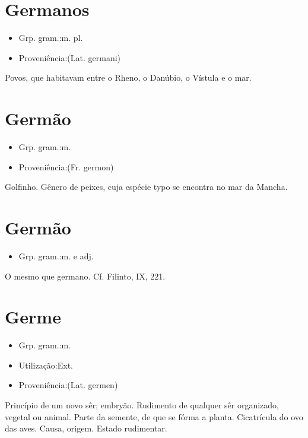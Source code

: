 \section{Germanos}
\begin{itemize}
\item {Grp. gram.:m. pl.}
\end{itemize}
\begin{itemize}
\item {Proveniência:(Lat. \textunderscore germani\textunderscore )}
\end{itemize}
Povos, que habitavam entre o Rheno, o Danúbio, o Vístula e o mar.
\section{Germão}
\begin{itemize}
\item {Grp. gram.:m.}
\end{itemize}
\begin{itemize}
\item {Proveniência:(Fr. \textunderscore germon\textunderscore )}
\end{itemize}
Golfinho.
Gênero de peixes, cuja espécie typo se encontra no mar da Mancha.
\section{Germão}
\begin{itemize}
\item {Grp. gram.:m.  e  adj.}
\end{itemize}
O mesmo que \textunderscore germano\textunderscore . Cf. Filinto, IX, 221.
\section{Germe}
\begin{itemize}
\item {Grp. gram.:m.}
\end{itemize}
\begin{itemize}
\item {Utilização:Ext.}
\end{itemize}
\begin{itemize}
\item {Proveniência:(Lat. \textunderscore germen\textunderscore )}
\end{itemize}
Princípio de um novo sêr; embryão.
Rudimento de qualquer sêr organizado, vegetal ou animal.
Parte da semente, de que se fórma a planta.
Cicatrícula do ovo das aves.
Causa, origem.
Estado rudimentar.
